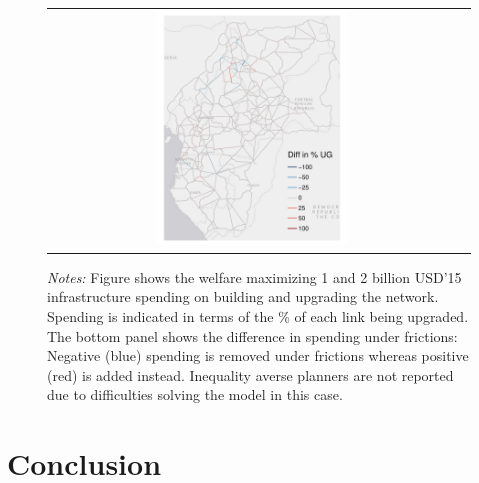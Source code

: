 \documentclass[a4paper]{article}
\begin{document}
\begin{figure}[H]
{\begin{tabular}{cc}
\includegraphics[width=0.48\textwidth]{"../figures/GE/trans_africa_network_GE_add_20g_2b_fixed_cgc_sigma3.8_rho0_julia_google_Ijk_bc_perc_ug_diff.pdf"}
\end{tabular}
}
\raggedright
\scriptsize 
\emph{Notes:} Figure shows the welfare maximizing 1 and 2 billion USD'15 infrastructure spending on building and upgrading the network. Spending is indicated in terms of the \% of each link being upgraded. The bottom panel shows the difference in spending under frictions: Negative (blue) spending is removed under frictions whereas positive (red) is added instead. Inequality averse planners are not reported due to difficulties solving the model in this case. \\ \vspace{-1cm}
\end{figure}

\hphantom{a}
\newpage

\section{Conclusion} 
\end{document}

